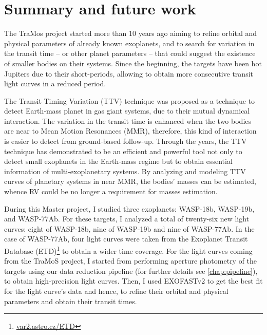 \chapter{Summary and future work}\label{chap:conclusion}

The TraMos project started more than 10 years ago aiming to refine orbital and physical parameters of already known exoplanets, and to search for variation in the transit time -- or other planet parameters -- that could suggest the existence of smaller bodies on their systems. Since the beginning, the targets have been hot Jupiters due to their short-periods, allowing to obtain more consecutive transit light curves in a reduced period. 


The Transit Timing Variation (TTV) technique was proposed as a technique to detect Earth-mass planet in gas giant systems, due to their mutual dynamical interaction. The variation in the transit time is enhanced when the two bodies are near to Mean Motion Resonances (MMR), therefore, this kind of interaction is easier to detect from ground-based follow-up. Through the years, the TTV technique has demonstrated to be an efficient and powerful tool not only to detect small exoplanets in the Earth-mass regime but to obtain essential information of multi-exoplanetary systems. By analyzing and modeling TTV curves of planetary systems in near MMR, the bodies' masses can be estimated, whence RV could be no longer a requirement for masses estimation.

During this Master project, I studied three exoplanets: WASP-18b, WASP-19b, and WASP-77Ab. For these targets, I analyzed a total of twenty-six new light curves: eight of WASP-18b, nine of WASP-19b and nine of WASP-77Ab. In the case of WASP-77Ab, four light curves were taken from the Exoplanet Transit Database (ETD)\footnote{\url{var2.astro.cz/ETD}} to obtain a wider time coverage. For the light curves coming from the TraMoS project, I started from performing aperture photometry of the targets using our data reduction pipeline (for further details see \ref{chap:pipeline}), to obtain high-precision light curves. Then, I used EXOFASTv2 \cite{Eastman2013,Eastman2017} to get the best fit for the light curve's data and hence, to refine their orbital and physical parameters and obtain their transit times.

